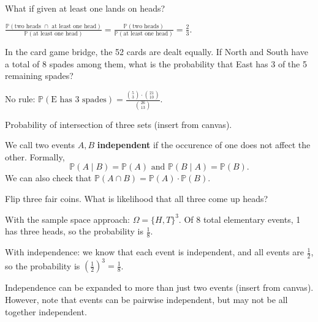 \begin{eg}
	What if given at least one lands on heads?
\end{eg}
\begin{explanation}
	\( \frac{\mathbb{P}(\text{two heads } \cap \text{ at least one head})}{\mathbb{P}(\text{at least one head})} = \frac{\mathbb{P}(\text{two heads})}{\mathbb{P}(\text{at least one head})} = \frac{2}{3}\). 
\end{explanation}

\begin{eg}
	In the card game bridge, the 52 cards are dealt equally. If North and South have a total of 8 spades among them, what is the probability that East has 3 of the 5 remaining spades?
\end{eg}
\begin{explanation}
	No rule: \( \mathbb{P}(\text{E has 3 spades}) = \frac{\binom{5}{3} \cdot \binom{21}{10}}{\binom{26}{13}} \).
\end{explanation}

\begin{theorem}
	Probability of intersection of three sets (insert from canvas).
\end{theorem}

\begin{definition}
	We call two events \( A,B \) \textbf{independent} if the occurence of one does not affect the other. Formally, \[
		\mathbb{P}(A \mid B) = \mathbb{P}(A) \text{ and } \mathbb{P}(B \mid A) = \mathbb{P}(B)
	.\] We can also check that \( \mathbb{P}(A \cap B) = \mathbb{P}(A)\cdot \mathbb{P}(B) \).
\end{definition}

\begin{eg}
	Flip three fair coins. What is likelihood that all three come up heads?
\end{eg}
\begin{explanation}
	With the sample space approach: \( \Omega =\{H,T\}^3  \). Of 8 total elementary events, 1 has three heads, so the probability is \( \frac{1}{8} \).

	With independence: we know that each event is independent, and all events are \( \frac{1}{2} \), so the probability is \( \left( \frac{1}{2} \right) ^3 =\frac{1}{8}\).
\end{explanation}

\begin{definition}
	Independence can be expanded to more than just two events (insert from canvas). However, note that events can be pairwise independent, but may not be all together independent.
\end{definition}

